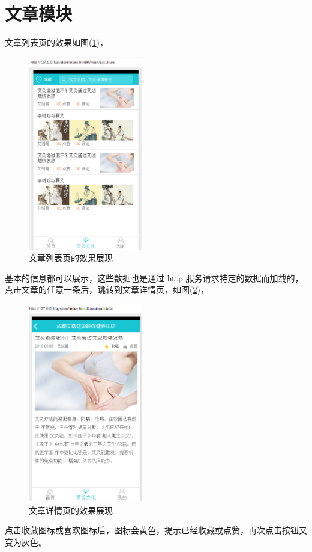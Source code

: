     \section{文章模块}
      \label{sec:文章模块}
        文章列表页的效果如图(\ref{fig:artlist_my})，
        \begin{figure}[htbp]
          \centering
          \includegraphics[width=5cm]{./img/artlist_my.png}
          \caption{文章列表页的效果展现}
          \label{fig:artlist_my}
        \end{figure}
        基本的信息都可以展示，这些数据也是通过 http 服务请求特定的数据而加载的，点击文章的任意一条后，跳转到文章详情页，如图(\ref{fig:artdetail_my})，
        \begin{figure}[htbp]
          \centering
          \includegraphics[width=5cm]{./img/artdetail_my.png}
          \caption{文章详情页的效果展现}
          \label{fig:artdetail_my}
        \end{figure}
        点击收藏图标或喜欢图标后，图标会黄色，提示已经收藏或点赞，再次点击按钮又变为灰色。

